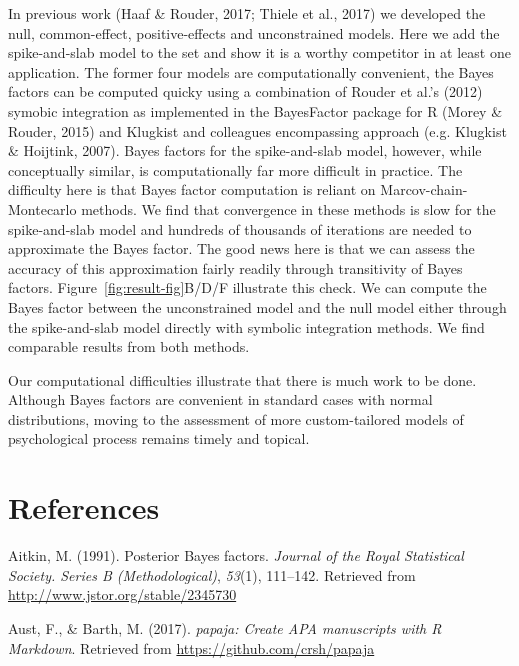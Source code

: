 \documentclass[english,man]{apa6}
\theoremstyle{definition}
\theoremstyle{definition}
\theoremstyle{remark}
\begin{document}
In previous work (Haaf \& Rouder, 2017; Thiele et al., 2017) we
developed the null, common-effect, positive-effects and unconstrained
models. Here we add the spike-and-slab model to the set and show it is a
worthy competitor in at least one application. The former four models
are computationally convenient, the Bayes factors can be computed quicky
using a combination of Rouder et al.'s (2012) symobic integration as
implemented in the BayesFactor package for R (Morey \& Rouder, 2015) and
Klugkist and colleagues encompassing approach (e.g. Klugkist \&
Hoijtink, 2007). Bayes factors for the spike-and-slab model, however,
while conceptually similar, is computationally far more difficult in
practice. The difficulty here is that Bayes factor computation is
reliant on Marcov-chain-Montecarlo methods. We find that convergence in
these methods is slow for the spike-and-slab model and hundreds of
thousands of iterations are needed to approximate the Bayes factor. The
good news here is that we can assess the accuracy of this approximation
fairly readily through transitivity of Bayes factors.
Figure~\ref{fig:result-fig}B/D/F illustrate this check. We can compute
the Bayes factor between the unconstrained model and the null model
either through the spike-and-slab model directly with symbolic
integration methods. We find comparable results from both methods.

Our computational difficulties illustrate that there is much work to be
done. Although Bayes factors are convenient in standard cases with
normal distributions, moving to the assessment of more custom-tailored
models of psychological process remains timely and topical.

\newpage

\section{References}\label{references}

\setlength{\parindent}{-0.5in} \setlength{\leftskip}{0.5in}

\hypertarget{refs}{}
\hypertarget{ref-Aitkin:1991}{}
Aitkin, M. (1991). Posterior Bayes factors. \emph{Journal of the Royal
Statistical Society. Series B (Methodological)}, \emph{53}(1), 111--142.
Retrieved from \url{http://www.jstor.org/stable/2345730}

\hypertarget{ref-R-papaja}{}
Aust, F., \& Barth, M. (2017). \emph{papaja: Create APA manuscripts with
R Markdown}. Retrieved from \url{https://github.com/crsh/papaja}
\end{document}
